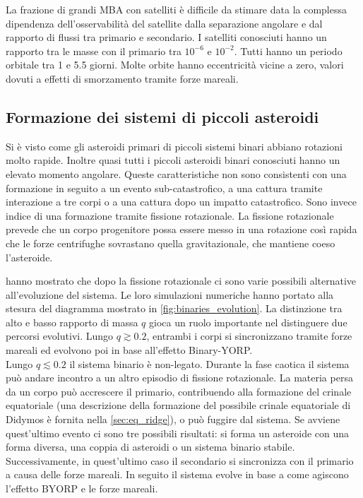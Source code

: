 \documentclass[a4paper,11pt,openright]{book}
\begin{document}
La frazione di grandi MBA con satelliti è difficile da stimare data la complessa dipendenza dell'osservabilità del satellite dalla separazione angolare e dal rapporto di flussi tra primario e secondario. I satelliti conosciuti hanno un rapporto tra le masse con il primario tra $10^{-6}$ e $10^{-2}$. Tutti hanno un periodo orbitale tra 1 e 5.5 giorni. Molte orbite hanno eccentricità vicine a zero, valori dovuti a effetti di smorzamento tramite forze mareali.

\subsection{Formazione dei sistemi di piccoli asteroidi}
Si è visto come gli asteroidi primari di piccoli sistemi binari abbiano rotazioni molto rapide. Inoltre quasi tutti i piccoli asteroidi binari conosciuti hanno un elevato momento angolare. Queste caratteristiche non sono consistenti con una formazione in seguito a un evento sub-catastrofico, a una cattura tramite interazione a tre corpi o a una cattura dopo un impatto catastrofico. Sono invece indice di una formazione tramite fissione rotazionale. La fissione rotazionale prevede che un corpo progenitore possa essere messo in una rotazione così rapida che le forze centrifughe sovrastano quella gravitazionale, che mantiene coeso l'asteroide.

\citet{jacobson_dynamics_2011} hanno mostrato che dopo la fissione rotazionale ci sono varie possibili alternative all'evoluzione del sistema. Le loro simulazioni numeriche hanno portato alla stesura del diagramma mostrato in \cref{fig:binaries_evolution}. La distinzione tra alto e basso rapporto di massa $q$ gioca un ruolo importante nel distinguere due percorsi evolutivi. Lungo $q\gtrsim0.2$, entrambi i corpi si sincronizzano tramite forze mareali ed evolvono poi in base all'effetto Binary-YORP.\\
Lungo $q\lesssim0.2$ il sistema binario è non-legato. Durante la fase caotica il sistema può andare incontro a un altro episodio di fissione rotazionale. La materia persa da un corpo può accrescere il primario, contribuendo alla formazione del crinale equatoriale (una descrizione della formazione del possibile crinale equatoriale di Didymos è fornita nella \cref{sec:eq_ridge}), o può fuggire dal sistema. Se avviene quest'ultimo evento ci sono tre possibili risultati: si forma un asteroide con una forma diversa, una coppia di asteroidi o un sistema binario stabile. Successivamente, in quest'ultimo caso il secondario si sincronizza con il primario a causa delle forze mareali. In seguito il sistema evolve in base a come agiscono l'effetto BYORP e le forze mareali.
\end{document}
